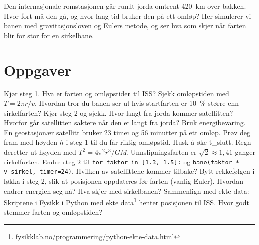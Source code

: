 \documentclass[11pt]{article}
\begin{document}

Den internasjonale romstasjonen går rundt jorda omtrent 420~km over bakken. Hvor fort må den gå, og hvor lang tid bruker den på ett omløp? Her simulerer vi banen med gravitasjonsloven og Eulers metode, og ser hva som skjer når farten blir for stor for en sirkelbane.

\section*{Oppgaver}

\begin{oppgaveliste}
\oppgave {}Kjør steg 1. Hva er farten og omløpstiden til ISS? Sjekk omløpstiden med $T = 2πr/v$.
\svar
\oppgave {}Hvordan tror du banen ser ut hvis startfarten er 10~\% større enn sirkelfarten? Kjør steg 2 og sjekk. Hvor langt fra jorda kommer satellitten?
\svar
\oppgave {}Hvorfor går satellitten saktere når den er langt fra jorda? Bruk energibevaring.
\svar
\oppgave {}En geostasjonær satellitt bruker 23 timer og 56 minutter på ett omløp. Prøv deg fram med høyden $h$ i steg 1 til du får riktig omløpstid. Husk å øke t\_slutt. Regn deretter ut høyden med $T^{2} = 4π^{2}r^{3}/GM$.
\svar
\oppgave {}Unnslipningsfarten er $\sqrt{2} \approx 1{,}41$ ganger sirkelfarten. Endre steg 2 til \texttt{for faktor in [1.3, 1.5]:} og \texttt{bane(faktor * v\_sirkel, timer=24)}. Hvilken av satellittene kommer tilbake?
\svar
\oppgave {}Bytt rekkefølgen i løkka i steg 2, slik at posisjonen oppdateres før farten (vanlig Euler). Hvordan endrer energien seg nå? Hva skjer med sirkelbanen?
\svar
\oppgave {}Sammenlign med ekte data: Skriptene i Fysikk i Python med ekte data\footnote{\url{fysikklab.no/programmering/python-ekte-data.html}} henter posisjonen til ISS. Hvor godt stemmer farten og omløpstiden?
\svar
\end{oppgaveliste}
\end{document}
